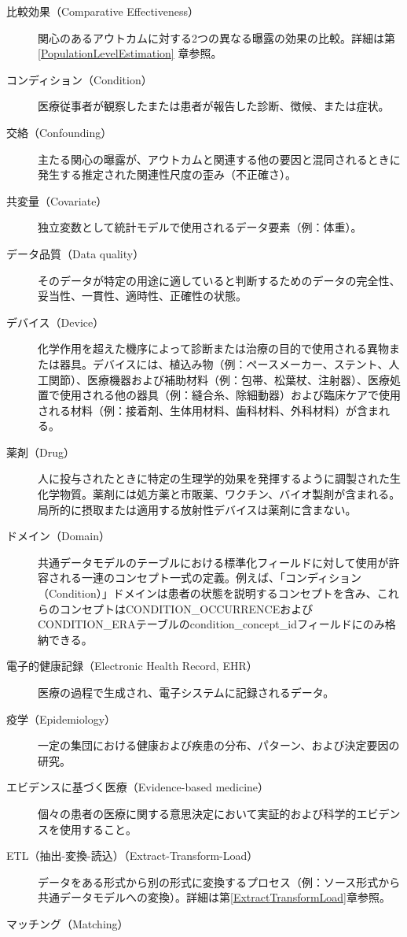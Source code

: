 \documentclass[
  11pt]{book}
\theoremstyle{definition}
\theoremstyle{definition}
\theoremstyle{definition}
\theoremstyle{definition}
\theoremstyle{remark}
\begin{document}
\begin{description}
\item[比較効果（Comparative Effectiveness）]
関心のあるアウトカムに対する2つの異なる曝露の効果の比較。詳細は第 \ref{PopulationLevelEstimation} 章参照。
\item[コンディション（Condition）]
医療従事者が観察したまたは患者が報告した診断、徴候、または症状。
\item[交絡（Confounding）]
主たる関心の曝露が、アウトカムと関連する他の要因と混同されるときに発生する推定された関連性尺度の歪み（不正確さ）。
\item[共変量（Covariate）]
独立変数として統計モデルで使用されるデータ要素（例：体重）。
\item[データ品質（Data quality）]
そのデータが特定の用途に適していると判断するためのデータの完全性、妥当性、一貫性、適時性、正確性の状態。
\item[デバイス（Device）]
化学作用を超えた機序によって診断または治療の目的で使用される異物または器具。デバイスには、植込み物（例：ペースメーカー、ステント、人工関節）、医療機器および補助材料（例：包帯、松葉杖、注射器）、医療処置で使用される他の器具（例：縫合糸、除細動器）および臨床ケアで使用される材料（例：接着剤、生体用材料、歯科材料、外科材料）が含まれる。
\item[薬剤（Drug）]
人に投与されたときに特定の生理学的効果を発揮するように調製された生化学物質。薬剤には処方薬と市販薬、ワクチン、バイオ製剤が含まれる。局所的に摂取または適用する放射性デバイスは薬剤に含まない。
\item[ドメイン（Domain）]
共通データモデルのテーブルにおける標準化フィールドに対して使用が許容される一連のコンセプト一式の定義。例えば、「コンディション（Condition）」ドメインは患者の状態を説明するコンセプトを含み、これらのコンセプトはCONDITION\_OCCURRENCEおよびCONDITION\_ERAテーブルのcondition\_concept\_idフィールドにのみ格納できる。
\item[電子的健康記録（Electronic Health Record, EHR）]
医療の過程で生成され、電子システムに記録されるデータ。
\item[疫学（Epidemiology）]
一定の集団における健康および疾患の分布、パターン、および決定要因の研究。
\item[エビデンスに基づく医療（Evidence-based medicine）]
個々の患者の医療に関する意思決定において実証的および科学的エビデンスを使用すること。
\item[ETL（抽出-変換-読込）（Extract-Transform-Load）]
データをある形式から別の形式に変換するプロセス（例：ソース形式から共通データモデルへの変換）。詳細は第\ref{ExtractTransformLoad}章参照。
\item[マッチング（Matching）]

\end{description}
\end{document}
